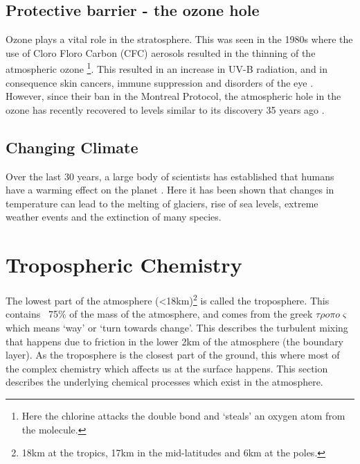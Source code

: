 %
\subsection{Protective barrier - the ozone hole}\label{sec:ozonerole}
Ozone plays a vital role in the stratosphere. This was seen in the 1980s where the use of Cloro Floro Carbon (CFC) aerosols resulted in the thinning of the atmospheric ozone \citep{ozonehole}\footnote{Here the chlorine attacks the double bond and `steals' an oxygen atom from the  molecule.}. This resulted in an increase in UV-B radiation, and in consequence skin cancers, immune suppression and disorders of the eye \citep{o3damage}. However, since their ban in the Montreal Protocol, the atmospheric hole in the ozone has recently recovered to levels similar to its discovery 35 years ago \citep{ozonerepair}.


\subsection{Changing Climate} \label{sec:climatechange}
Over the last 30 years, a large body of scientists has established that humans have a warming effect on the planet \citep{IPCC1990Science,IPCC1995Science,IPCC2007Science,IPCC2013Science,ipbes}. Here it has been shown that changes in temperature can lead to the melting of glaciers, rise of sea levels, extreme weather events and the extinction of many species.


\citep{failparis}



\section{Tropospheric Chemistry}

The lowest part of the atmosphere (<18km)\footnote{18km at the tropics, 17km in the mid-latitudes and 6km at the poles. } is called the troposphere. This contains ~75\% of the mass of the atmosphere, and comes from the greek $\tau\rho o \pi o \varsigma$ which means `way' or `turn towards change'. This describes the turbulent mixing that happens due to friction in the lower 2km of the atmosphere (the boundary layer). As the troposphere is the closest part of the ground, this where most of the complex chemistry which affects us at the surface happens. This section describes the underlying chemical processes which exist in the atmosphere.




